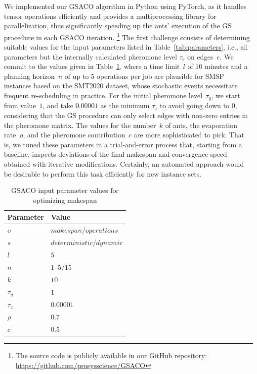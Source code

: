 \documentclass[runningheads]{llncs}
\begin{document}
We implemented our GSACO algorithm in Python using PyTorch, as it handles tensor operations efficiently and provides a multiprocessing library for
parallelization, thus significantly speeding up the ants' execution of the GS procedure in each GSACO iteration.%
\footnote{The source code is publicly available in our GitHub repository:
\url{https://github.com/prosysscience/GSACO}}
The first challenge consists of determining suitable values for the input
parameters listed in Table~\ref{tab:parameters}, i.e.,
all parameters but the internally calculated pheromone level $\tau_e$ on edges~$e$.
We commit to the values given in Table~\ref{tab:p_value},
where a time limit~$l$ of $10$ minutes and a planning horizon~$n$ of
up to $5$ operations per job are plausible for SMSP instances
based on the SMT2020 dataset, whose stochastic events necessitate frequent
re-scheduling in practice.
For the initial pheromone level~$\tau_y$,
we start from value~$1$, and take $0.00001$ as the minimum $\tau_z$
to avoid going down to $0$, considering that the GS procedure can only
select edges with non-zero entries in the pheromone matrix.
The values for the number~$k$ of ants, the evaporation rate~$\rho$,
and the pheromone contribution~$c$ are more sophisticated to pick.
That is, we tuned these parameters in a trial-and-error process that,
starting from a baseline, inspects deviations of the final makespan and convergence speed obtained with iterative modifications.
Certainly, an automated approach would be desirable to
perform this task efficiently for new instance sets.%
%
\begin{table}[t]
\caption{GSACO input parameter values for optimizing makespan}\label{tab:p_value} \centering
\begin{tabular}{|l|l|}
	\hline
	Parameter & Value \\ \hline
	$o$ & $makespan$/$operations$        \\
	$s$ & $deterministic$/$dynamic$        \\
	$l$ & $5$        \\
	$n$ & $1$--$5$/$15$ \\
	$k$ & $10$ \\
	$\tau_{y}$ & $1$ \\
	$\tau_{z}$ & $0.00001$ \\
	$\rho$ & $0.7$ \\
	$c$ & $0.5$ \\
	\hline
\end{tabular}
\end{table}
\end{document}
